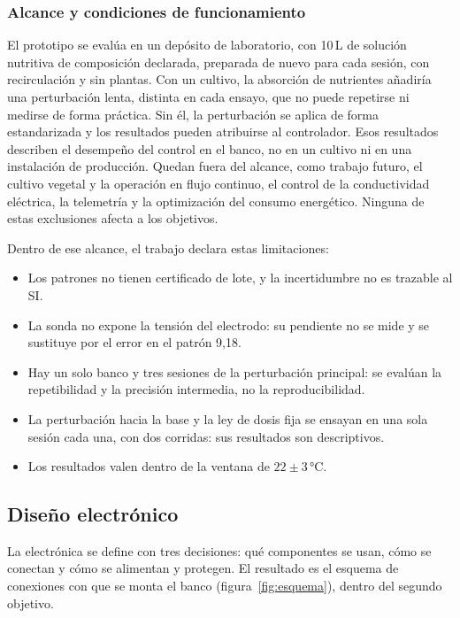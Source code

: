\subsubsection{Alcance y condiciones de funcionamiento}\label{sec:alcance}
El prototipo se evalúa en un depósito de laboratorio, con 10\,L de solución nutritiva de composición declarada, preparada de nuevo para cada sesión, con recirculación y sin plantas. Con un cultivo, la absorción de nutrientes añadiría una perturbación lenta, distinta en cada ensayo, que no puede repetirse ni medirse de forma práctica. Sin él, la perturbación se aplica de forma estandarizada y los resultados pueden atribuirse al controlador. Esos resultados describen el desempeño del control en el banco, no en un cultivo ni en una instalación de producción. Quedan fuera del alcance, como trabajo futuro, el cultivo vegetal y la operación en flujo continuo, el control de la conductividad eléctrica, la telemetría y la optimización del consumo energético. Ninguna de estas exclusiones afecta a los objetivos.

Dentro de ese alcance, el trabajo declara estas limitaciones:
\begin{itemize}
\item Los patrones no tienen certificado de lote, y la incertidumbre no es trazable al SI.
\item La sonda no expone la tensión del electrodo: su pendiente no se mide y se sustituye por el error en el patrón 9,18.
\item Hay un solo banco y tres sesiones de la perturbación principal: se evalúan la repetibilidad y la precisión intermedia, no la reproducibilidad.
\item La perturbación hacia la base y la ley de dosis fija se ensayan en una sola sesión cada una, con dos corridas: sus resultados son descriptivos.
\item Los resultados valen dentro de la ventana de $22\pm3$\,°C.
\end{itemize}

\subsection{Diseño electrónico}\label{sec:elec}

La electrónica se define con tres decisiones: qué componentes se usan, cómo se conectan y cómo se alimentan y protegen. El resultado es el esquema de conexiones con que se monta el banco (figura~\ref{fig:esquema}), dentro del segundo objetivo.

